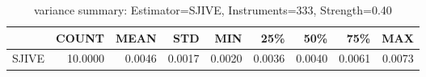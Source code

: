 \begin{table}[ht]
\centering
\caption{variance summary: Estimator=SJIVE, Instruments=333, Strength=0.40}
\begin{tabular}{lrrrrrrrr}
\toprule
 & COUNT & MEAN & STD & MIN & 25\% & 50\% & 75\% & MAX \\
\midrule
SJIVE & 10.0000 & 0.0046 & 0.0017 & 0.0020 & 0.0036 & 0.0040 & 0.0061 & 0.0073 \\
\bottomrule
\end{tabular}
\end{table}
